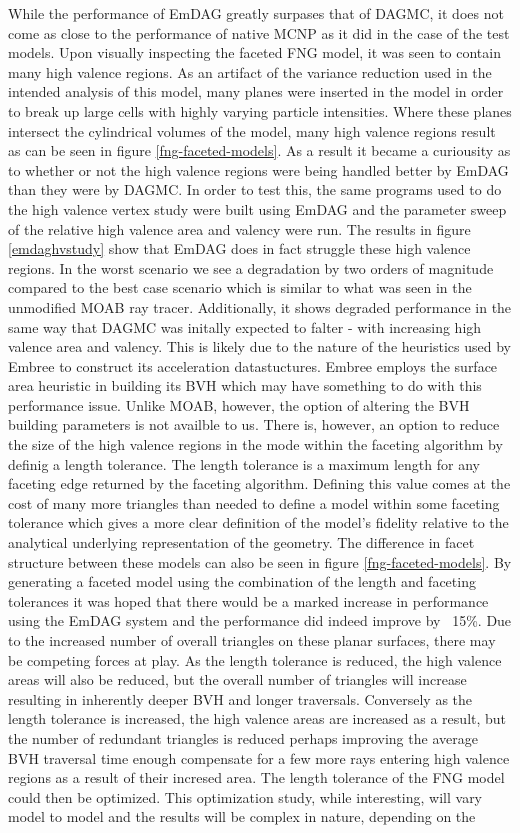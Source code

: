 \documentclass[10pt, a4paper]{article}
\begin{document}
While the performance of EmDAG greatly surpases that of DAGMC, it does not come as close to the performance of native MCNP as it did in the case of the test models. Upon visually inspecting the faceted FNG model, it was seen to contain many high valence regions. As an artifact of the variance reduction used in the intended analysis of this model, many planes were inserted in the model in order to break up large cells with highly varying particle intensities. Where these planes intersect the cylindrical volumes of the model, many high valence regions result as can be seen in figure \ref{fng-faceted-models}. As a result it became a curiousity as to whether or not the high valence regions were being handled better by EmDAG than they were by DAGMC. In order to test this, the same programs used to do the high valence vertex study were built using EmDAG and the parameter sweep of the relative high valence area and valency were run. The results in figure \ref{emdaghvstudy} show that EmDAG does in fact struggle these high valence regions. In the worst scenario we see a degradation by two orders of magnitude compared to the best case scenario which is similar to what was seen in the unmodified MOAB ray tracer. Additionally, it shows degraded performance in the same way that DAGMC was initally expected to falter - with increasing high valence area and valency. This is likely due to the nature of the heuristics used by Embree to construct its acceleration datastuctures. Embree employs the surface area heuristic in building its BVH which may have something to do with this performance issue. Unlike MOAB, however, the option of altering the BVH building parameters is not availble to us. There is, however, an option to reduce the size of the high valence regions in the mode within the faceting algorithm by definig a length tolerance. The length tolerance is a maximum length for any faceting edge returned by the faceting algorithm. Defining this value comes at the cost of many more triangles than needed to define a model within some faceting tolerance which gives a more clear definition of the model's fidelity relative to the analytical underlying representation of the geometry. The difference in facet structure between these models can also be seen in figure \ref{fng-faceted-models}. By generating a faceted model using the combination of the length and faceting tolerances it was hoped that there would be a marked increase in performance using the EmDAG system and the performance did indeed improve by ~15\%. Due to the increased number of overall triangles on these planar surfaces, there may be competing forces at play. As the length tolerance is reduced, the high valence areas will also be reduced, but the overall number of triangles will increase resulting in inherently deeper BVH and longer traversals. Conversely as the length tolerance is increased, the high valence areas are increased as a result, but the number of redundant triangles is reduced perhaps improving the average BVH traversal time enough compensate for a few more rays entering high valence regions as a result of their incresed area. The length tolerance of the FNG model could then be optimized. This optimization study, while interesting, will vary model to model and the results will be complex in nature, depending on the 
\end{document}
